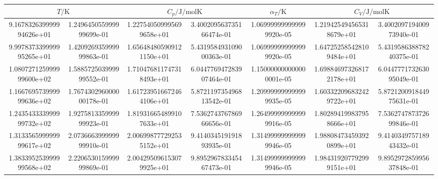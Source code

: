 \begin{table}
  \centering
  \begin{tabular}{  
S[round-mode = places , round-precision = 0,scientific-notation=fixed, fixed-exponent = 0]
@{${}\pm \quad$} 
S[round-mode = places , round-precision = 0,scientific-notation=fixed, fixed-exponent = 0]
S[round-mode = places , round-precision = 0,scientific-notation=fixed, fixed-exponent = 0]
@{${}\pm{}$} 
S[round-mode = places , round-precision = 0] 
S[round-mode = places , round-precision = 2,scientific-notation=fixed, fixed-exponent = -6 ] 
S[round-mode = places , round-precision = 0,scientific-notation=fixed, fixed-exponent = 0]
@{${}\pm{}$} 
S[round-mode = places , round-precision = 0] 
}
    \toprule
      & 
    & 
    $\alpha_T / \si{\kelvin}$ & 
    \\
    \midrule
9.167832639999994626e+01 & 1.249645055999999699e-01 & 1.227540509995699658e+01 & 3.400209563735166474e-01 & 1.069999999999999920e-05 & 1.219425494565318679e+01 & 3.400209719400973940e-01\\
9.997837339999995265e+01 & 1.420926935999999863e-01 & 1.656484805909121150e+01 & 5.431958493109000363e-01 & 1.069999999999999920e-05 & 1.647252585428109484e+01 & 5.431958638878240375e-01\\
1.080727125999999600e+02 & 1.588572503999999552e-01 & 1.710476811747318493e+01 & 6.044776947283907464e-01 & 1.150000000000000001e-05 & 1.698846973268172178e+01 & 6.044777173263095049e-01\\
1.166769573999999636e+02 & 1.767430296000000178e-01 & 1.617239516672464106e+01 & 5.872119735496813542e-01 & 1.209999999999999935e-05 & 1.603322096832429722e+01 & 5.872120091844975631e-01\\
1.243543333999999732e+02 & 1.927581335999999923e-01 & 1.819316654899107633e+01 & 7.536274376786966656e-01 & 1.264999999999999916e-05 & 1.802894199837958666e+01 & 7.536274787372699846e-01\\
1.313356599999999617e+02 & 2.073666399999999910e-01 & 2.006998777292535152e+01 & 9.414034519191893935e-01 & 1.314999999999999946e-05 & 1.988084734593920899e+01 & 9.414034975718943432e-01\\
1.383395253999999568e+02 & 2.220653015999999869e-01 & 2.004295096153079925e+01 & 9.895296783345467473e-01 & 1.314999999999999946e-05 & 1.984319207792999151e+01 & 9.895297285995637848e-01\\

\end{tabular}
\end{table}
